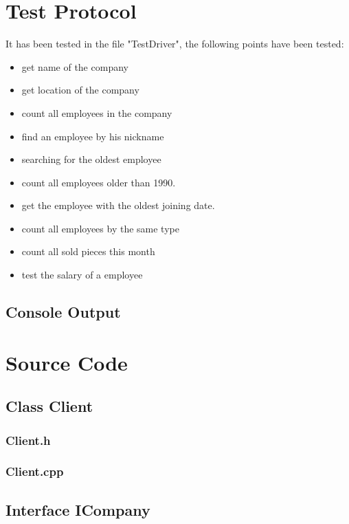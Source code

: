 \section{Test Protocol}
It has been tested in the file "TestDriver", the following points have been tested:
\begin{itemize}
	\item get name of the company
	\item get location of the company
	\item count all employees in the company
	\item find an employee by his nickname
	\item searching for the oldest employee
	\item count all employees older than 1990.
	\item get the employee with the oldest joining date.
	\item count all employees by the same type
	\item count all sold pieces this month
	\item test the salary of a employee
\end{itemize}

\subsection{Console Output}
\newpage

\section{Source Code}


\subsection{Class Client}
\subsubsection{Client.h}
\newpage
\subsubsection{Client.cpp}

\subsection{Interface ICompany}
